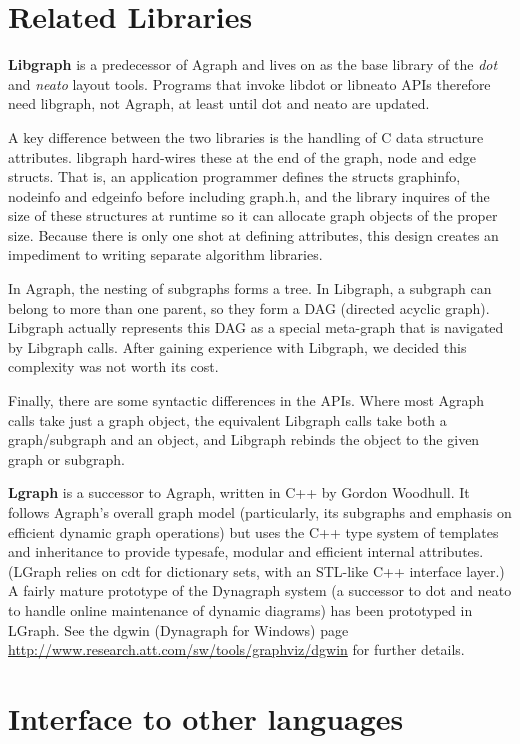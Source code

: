 \documentclass[11pt,letterpaper]{article}
\begin{document}
\section{Related Libraries}
\label{sec:relatedlibraries}
{\bf Libgraph} is a predecessor of Agraph and lives on as the
base library of the {\it dot} and {\it neato} layout tools.
Programs that invoke libdot or libneato APIs therefore need
libgraph, not Agraph, at least until dot and neato are updated.

A key difference between the two libraries is the handling of
C data structure attributes.  libgraph hard-wires these
at the end of the graph, node and edge structs.  That is,
an application programmer defines the structs graphinfo, nodeinfo
and edgeinfo before including graph.h, and the library inquires of
the size of these structures at runtime so it can allocate graph
objects of the proper size.  Because there is only one shot at
defining attributes, this design creates an impediment to writing
separate algorithm libraries.

In Agraph, the nesting of subgraphs forms a tree.
In Libgraph, a subgraph can belong to more than one parent,
so they form a DAG (directed acyclic graph). Libgraph
actually represents this DAG as a special meta-graph
that is navigated by Libgraph calls.  After gaining
experience with Libgraph, we decided this complexity
was not worth its cost.

Finally, there are some syntactic differences in the APIs.
Where most Agraph calls take just a graph object,
the equivalent Libgraph calls take both a graph/subgraph and
an object, and Libgraph rebinds the object to the given
graph or subgraph.

{\bf Lgraph} is a successor to Agraph, written in C++ by Gordon Woodhull.
It follows Agraph's overall graph model (particularly, its subgraphs and
emphasis on efficient dynamic graph operations) but uses the C++ type
system of templates and inheritance to provide typesafe, modular and
efficient internal attributes.  (LGraph relies on cdt for dictionary
sets, with an STL-like C++ interface layer.)  A fairly mature prototype
of the Dynagraph system (a successor to dot and neato to handle
online maintenance of dynamic diagrams) has been prototyped in LGraph.
See the dgwin (Dynagraph for Windows) page 
\url{http://www.research.att.com/sw/tools/graphviz/dgwin} for further details. 

\section{Interface to other languages}
\label{sec:interfacetootherlanguages}
\end{document}
